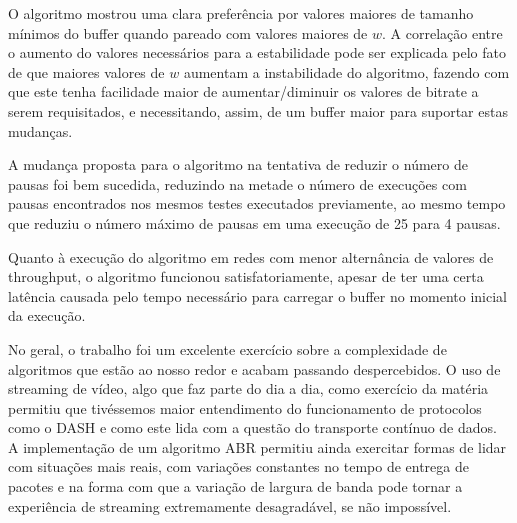 \documentclass[10pt,twocolumn,letterpaper]{article}
\begin{document}
	O algoritmo mostrou uma clara preferência por valores maiores de tamanho mínimos do buffer quando pareado com valores maiores de $w$. A correlação entre o aumento do valores necessários para a estabilidade pode ser explicada pelo fato de que maiores valores de $w$ aumentam a instabilidade do algoritmo, fazendo com que este tenha facilidade maior de aumentar/diminuir os valores de bitrate a serem requisitados, e necessitando, assim, de um buffer maior para suportar estas mudanças. 
	
	A mudança proposta para o algoritmo na tentativa de reduzir o número de pausas foi bem sucedida, reduzindo na metade o número de execuções com pausas encontrados nos mesmos testes executados previamente, ao mesmo tempo que reduziu o número máximo de pausas em uma execução de 25 para 4 pausas. 
	
	Quanto à execução do algoritmo em redes com menor alternância de valores de throughput, o algoritmo funcionou satisfatoriamente, apesar de ter uma certa latência causada pelo tempo necessário para carregar o buffer no momento inicial da execução. 
	
	No geral, o trabalho foi um excelente exercício sobre a complexidade de algoritmos que estão ao nosso redor e acabam passando despercebidos. O uso de streaming de vídeo, algo que faz parte do dia a dia, como exercício da matéria permitiu que tivéssemos maior entendimento do funcionamento de protocolos como o DASH e como este lida com a questão do transporte contínuo de dados. A implementação de um algoritmo ABR permitiu ainda exercitar formas de lidar com situações mais reais, com variações constantes no tempo de entrega de pacotes e na forma com que a variação de largura de banda pode tornar a experiência de streaming extremamente desagradável, se não impossível.
	
	{\small
		
		
	}
	
\end{document}
